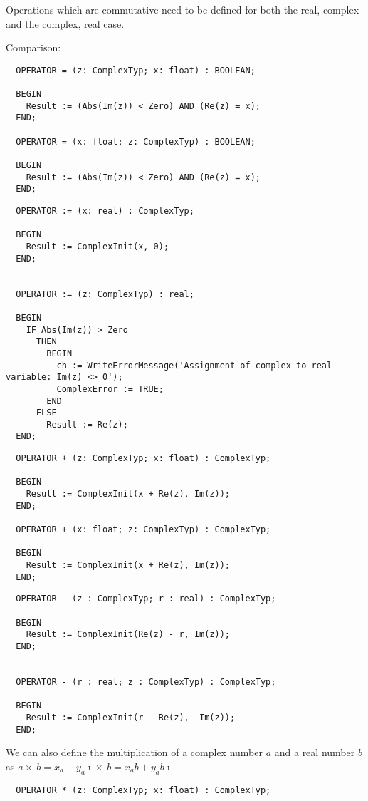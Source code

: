 \begin{refsection}
Operations which are commutative need to be defined for both the real, complex and the complex, real case.


Comparison:
\begin{lstlisting}
  OPERATOR = (z: ComplexTyp; x: float) : BOOLEAN;

  BEGIN
    Result := (Abs(Im(z)) < Zero) AND (Re(z) = x);
  END;

  OPERATOR = (x: float; z: ComplexTyp) : BOOLEAN;

  BEGIN
    Result := (Abs(Im(z)) < Zero) AND (Re(z) = x);
  END;
\end{lstlisting}



\begin{lstlisting}
  OPERATOR := (x: real) : ComplexTyp;

  BEGIN
    Result := ComplexInit(x, 0);
  END;


  OPERATOR := (z: ComplexTyp) : real;

  BEGIN
    IF Abs(Im(z)) > Zero
      THEN
        BEGIN
          ch := WriteErrorMessage('Assignment of complex to real variable: Im(z) <> 0');
          ComplexError := TRUE;
        END
      ELSE
        Result := Re(z);
  END;
\end{lstlisting}

\begin{lstlisting}
  OPERATOR + (z: ComplexTyp; x: float) : ComplexTyp;

  BEGIN
    Result := ComplexInit(x + Re(z), Im(z));
  END;

  OPERATOR + (x: float; z: ComplexTyp) : ComplexTyp;

  BEGIN
    Result := ComplexInit(x + Re(z), Im(z));
  END;
\end{lstlisting}

\begin{lstlisting}
  OPERATOR - (z : ComplexTyp; r : real) : ComplexTyp;

  BEGIN
    Result := ComplexInit(Re(z) - r, Im(z));
  END;


  OPERATOR - (r : real; z : ComplexTyp) : ComplexTyp;

  BEGIN
    Result := ComplexInit(r - Re(z), -Im(z));
  END;
\end{lstlisting}

We can also define the multiplication of a complex number \(a \) and a real number \(b \) as \(a \times\ b = x_a + y_a\imath \times\ b = x_a b + y_a b \imath \).
\begin{lstlisting}
  OPERATOR * (z: ComplexTyp; x: float) : ComplexTyp;


\end{lstlisting}
\end{refsection}
